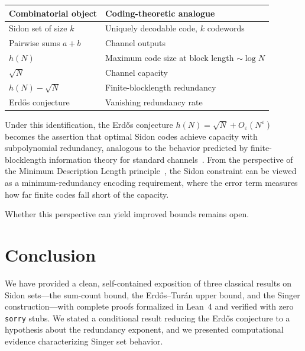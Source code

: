 \documentclass[11pt]{amsart}
\theoremstyle{plain}
\theoremstyle{definition}
\theoremstyle{remark}
\begin{document}
\begin{center}
\begin{tabular}{ll}
\toprule
\textbf{Combinatorial object} & \textbf{Coding-theoretic analogue} \\
\midrule
Sidon set of size $k$ & Uniquely decodable code, $k$ codewords \\
Pairwise sums $a+b$ & Channel outputs \\
$h(N)$ & Maximum code size at block length $\sim\!\log N$ \\
$\sqrt{N}$ & Channel capacity \\
$h(N) - \sqrt{N}$ & Finite-blocklength redundancy \\
Erd\H{o}s conjecture & Vanishing redundancy rate \\
\bottomrule
\end{tabular}
\end{center}

Under this identification, the Erd\H{o}s conjecture
$h(N) = \sqrt{N} + O_\varepsilon(N^\varepsilon)$ becomes the
assertion that optimal Sidon codes achieve capacity with
subpolynomial redundancy, analogous to the behavior predicted by
finite-blocklength information theory for standard
channels~\cite{polyanskiy_poor_verdu_2010}.
From the perspective of the Minimum Description Length
principle~\cite{rissanen_1978}, the Sidon constraint can be viewed as
a minimum-redundancy encoding requirement, where the error term
measures how far finite codes fall short of the capacity.

Whether this perspective can yield improved bounds remains open.

\section{Conclusion}\label{sec:conclusion}

We have provided a clean, self-contained exposition of three classical
results on Sidon sets---the sum-count bound, the Erd\H{o}s--Tur\'an
upper bound, and the Singer construction---with complete proofs
formalized in Lean~4 and verified with zero \texttt{sorry} stubs.
We stated a conditional result reducing the Erd\H{o}s conjecture to a
hypothesis about the redundancy exponent, and we presented
computational evidence characterizing Singer set behavior.
\end{document}

